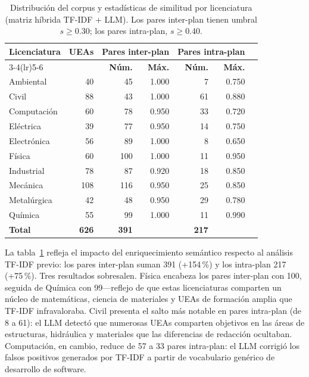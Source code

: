 \documentclass[11pt,a4paper]{article}
\begin{document}
\begin{table}[H]
\centering
\caption{Distribución del corpus y estadísticas de similitud por licenciatura (matriz híbrida TF-IDF + LLM).
Los pares inter-plan tienen umbral $s \geq 0.30$; los pares intra-plan, $s \geq 0.40$.}
\label{tab:corpus}
\small
\begin{tabular}{lrrrrrr}
\toprule
\textbf{Licenciatura} &
\textbf{UEAs} &
\multicolumn{2}{c}{\textbf{Pares inter-plan}} &
\multicolumn{2}{c}{\textbf{Pares intra-plan}} \\
\cmidrule(lr){3-4}\cmidrule(lr){5-6}
& & \textbf{Núm.} & \textbf{Máx.} & \textbf{Núm.} & \textbf{Máx.} \\
\midrule
Ambiental      &  40 &  45 & 1.000 &   7 & 0.750 \\
Civil          &  88 &  43 & 1.000 &  61 & 0.880 \\
Computación    &  60 &  78 & 0.950 &  33 & 0.720 \\
Eléctrica      &  39 &  77 & 0.950 &  14 & 0.750 \\
Electrónica    &  56 &  89 & 1.000 &   8 & 0.650 \\
Física         &  60 & 100 & 1.000 &  11 & 0.950 \\
Industrial     &  78 &  87 & 0.920 &  18 & 0.850 \\
Mecánica       & 108 & 116 & 0.950 &  25 & 0.850 \\
Metalúrgica    &  42 &  48 & 0.950 &  29 & 0.780 \\
Química        &  55 &  99 & 1.000 &  11 & 0.990 \\
\midrule
\textbf{Total} & \textbf{626} & \textbf{391} & & \textbf{217} & \\
\bottomrule
\end{tabular}
\end{table}

La tabla~\ref{tab:corpus} refleja el impacto del enriquecimiento semántico respecto al análisis TF-IDF previo: los pares inter-plan suman 391 (+154\,\%) y los intra-plan 217 (+75\,\%).
Tres resultados sobresalen.
Física encabeza los pares inter-plan con 100, seguida de Química con 99---reflejo de que estas licenciaturas comparten un núcleo de matemáticas, ciencia de materiales y UEAs de formación amplia que TF-IDF infravaloraba.
Civil presenta el salto más notable en pares intra-plan (de 8 a 61): el LLM detectó que numerosas UEAs comparten objetivos en las áreas de estructuras, hidráulica y materiales que las diferencias de redacción ocultaban.
Computación, en cambio, reduce de 57 a 33 pares intra-plan: el LLM corrigió los falsos positivos generados por TF-IDF a partir de vocabulario genérico de desarrollo de software.
\end{document}
